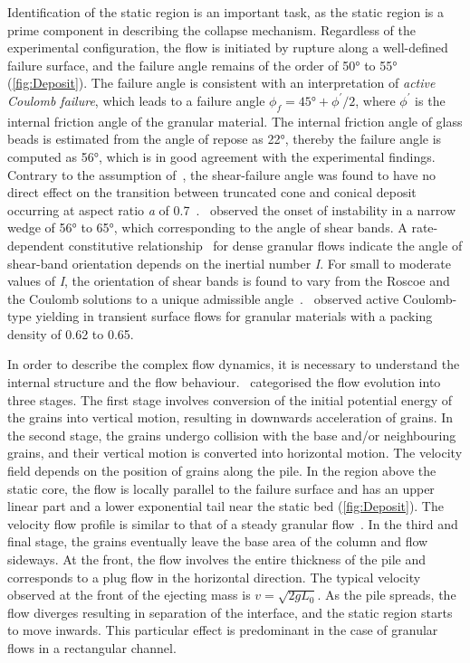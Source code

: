Identification of the static region is an important task, as the static region 
is a prime component in describing the collapse mechanism. Regardless of the 
experimental configuration, the flow is initiated by rupture along a 
well-defined failure surface, and the failure angle remains of the order of 
50\si{\degree} to 55\si{\degree} (\cref{fig:Deposit}). The failure angle is 
consistent with an interpretation of \textit{active Coulomb failure}, which 
leads to a failure angle $\phi_{\textit{f}}=45\si{\degree} +\phi^\prime / 2$, 
where $\phi^\prime$ is the internal friction angle of the granular material. 
The internal friction angle of glass beads is estimated from the angle of 
repose as 22\si{\degree}, thereby the failure angle is 
computed as 56\si{\degree}, which is in good agreement with the experimental 
findings. Contrary to the assumption of~\citet{Lajeunesse2004}, the 
shear-failure 
angle was found to have no direct effect on the transition between truncated 
cone and conical deposit occurring at aspect ratio \textit{a} of 
0.7~\citep{Lajeunesse2005}.~\citet{Schaeffer1990} observed the onset of 
instability in a narrow wedge of 56\si{\degree} to 
65\si{\degree}, which corresponding to the angle of shear bands. A 
rate-dependent constitutive relationship~\citep{Jop2006} for dense granular 
flows indicate the angle of shear-band orientation depends on the inertial 
number \textit{I}. For small to moderate values of \textit{I}, the orientation 
of shear bands is found to vary from the Roscoe and the Coulomb solutions to a 
unique admissible angle~\citep{Lemiale2011}.~\citet{Daerr1999} observed active 
Coulomb-type yielding in transient surface flows for granular materials with 
a packing density of 0.62 to 0.65. 


In order to describe the complex flow dynamics, it is necessary to understand 
the internal structure and the flow behaviour.~\citep{Staron2007a} categorised 
the flow evolution into three stages. 
The first stage involves conversion of the initial potential energy of the 
grains into vertical motion, resulting in downwards acceleration of grains. In 
the second stage, the grains undergo collision with the base and/or 
neighbouring grains, and their vertical motion is converted into horizontal 
motion. The velocity field depends on the position of grains along the 
pile. In the region above the static core, the 
flow is locally parallel to the failure surface and has an upper linear part 
and a lower exponential tail near the static bed (\cref{fig:Deposit}). The 
velocity flow profile is similar to that of a steady granular 
flow~\citep{Midi2004}. In the third and final 
stage, the grains eventually leave the base area of the column and flow 
sideways. At the 
front, the flow involves the entire thickness of the pile and corresponds to a 
plug flow in the horizontal direction. The typical 
velocity observed at the front of the ejecting mass is 
$\textit{v}=\sqrt{2\textit{g}\textit{L}_{\textit{0}}}$. As the pile spreads, 
the flow diverges resulting in separation of the interface, and the static 
region starts to move inwards. This particular effect is 
predominant in the case of granular flows in a rectangular channel. 

